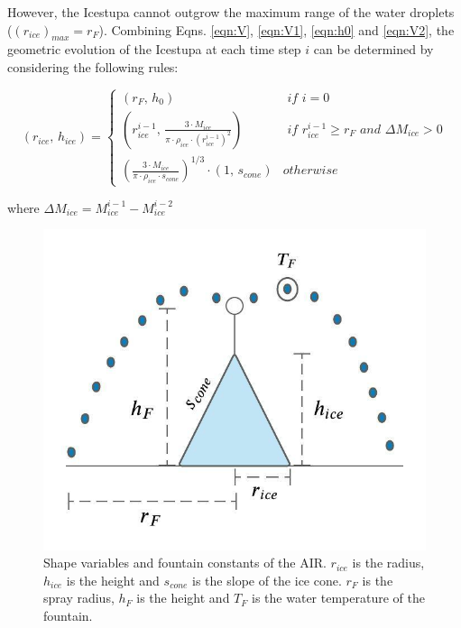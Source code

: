 \documentclass[utf8]{frontiersSCNS} %
\begin{document}
However, the Icestupa cannot outgrow the maximum range of the water droplets ($(r_{ice})_{max} = r_{F}$). Combining
Eqns. \ref{eqn:V},  \ref{eqn:V1}, \ref{eqn:h0} and \ref{eqn:V2}, the geometric evolution of the Icestupa at each time
step $i$ can be determined by considering the following rules:

\begin{equation} (r_{ice},\, h_{ice}) = \left\{ \begin{array}{ll} (r_F ,\, h_0)                                                                        & \textit{ if } i=0 \\
             (r_{ice}^{i-1},\, \frac{3 \cdot M_{ice}}{\pi \cdot \rho_{ice} \cdot {(r_{ice}^{i-1})}^2}) & \textit{ if }
             r_{ice}^{i-1} \geq r_{F} \textit{ and } \Delta M_{ice} > 0                                                    \\ (\frac{3 \cdot M_{ice}}{\pi \cdot \rho_{ice} \cdot s_{cone}})^{1/3} \cdot (1,\,  s_{cone}) &
             otherwise\end{array} \right.  \label{eqn:A2} \end{equation}

where $\Delta M_{ice} = M_{ice}^{i-1} - M_{ice}^{i-2}$

\begin{figure} \begin{center} \includegraphics[width=10
			cm]{Figures/shape_parameters.jpeg} \end{center} \caption{Shape variables and fountain constants of the AIR. $r_{ice}$ is
		the radius, $h_{ice}$ is the height and $s_{cone}$ is the slope of the ice cone. $r_F$ is the spray radius, $h_F$ is the
		height and $T_F$ is the water temperature of the fountain.} \label{fig:shape} \end{figure}
\end{document}
